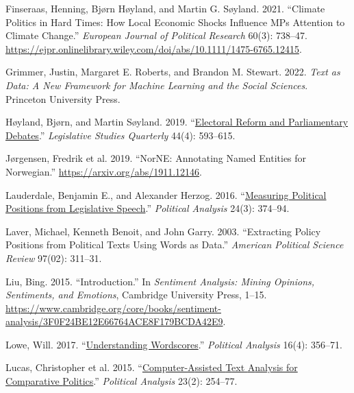 \documentclass[
]{article}
\newlength{\cslhangindent}
\newlength{\cslentryspacingunit} %
\newenvironment{CSLReferences}[2] %
 {%
  \setlength{\parindent}{0pt}
  \ifodd #1
  \let\oldpar\par
  \def\par{\hangindent=\cslhangindent\oldpar}
  \fi
  \setlength{\parskip}{#2\cslentryspacingunit}
 }%
 {}
\begin{document}
\begin{CSLReferences}{1}{0}
\leavevmode{}%
Finseraas, Henning, Bjørn Høyland, and Martin G. Søyland. 2021.
{``Climate Politics in Hard Times: How Local Economic Shocks Influence
MPs Attention to Climate Change.''} \emph{European Journal of Political
Research} 60(3): 738--47.
\url{https://ejpr.onlinelibrary.wiley.com/doi/abs/10.1111/1475-6765.12415}.

\leavevmode{}%
Grimmer, Justin, Margaret E. Roberts, and Brandon M. Stewart. 2022.
\emph{Text as Data: A New Framework for Machine Learning and the Social
Sciences}. Princeton University Press.

\leavevmode{}%
Høyland, Bjørn, and Martin Søyland. 2019.
{``\href{https://doi.org/10.1111/lsq.12237}{Electoral Reform and
Parliamentary Debates}.''} \emph{Legislative Studies Quarterly} 44(4):
593--615.

\leavevmode{}%
Jørgensen, Fredrik et al. 2019. {``NorNE: Annotating Named Entities for
Norwegian.''} \url{https://arxiv.org/abs/1911.12146}.

\leavevmode{}%
Lauderdale, Benjamin E., and Alexander Herzog. 2016.
{``\href{https://doi.org/10.1093/pan/mpw017}{Measuring Political
Positions from Legislative Speech}.''} \emph{Political Analysis} 24(3):
374--94.

\leavevmode{}%
Laver, Michael, Kenneth Benoit, and John Garry. 2003. {``{E}xtracting
{P}olicy {P}ositions from {P}olitical {T}exts {U}sing {W}ords as
{D}ata.''} \emph{American Political Science Review} 97(02): 311--31.

\leavevmode{}%
Liu, Bing. 2015. {``Introduction.''} In \emph{Sentiment Analysis: Mining
Opinions, Sentiments, and Emotions}, Cambridge University Press, 1--15.
\url{https://www.cambridge.org/core/books/sentiment-analysis/3F0F24BE12E66764ACE8F179BCDA42E9}.

\leavevmode{}%
Lowe, Will. 2017.
{``\href{https://doi.org/10.1093/pan/mpn004}{Understanding
Wordscores}.''} \emph{Political Analysis} 16(4): 356--71.

\leavevmode{}%
Lucas, Christopher et al. 2015.
{``\href{https://doi.org/10.1093/pan/mpu019}{Computer-{A}ssisted {T}ext
{A}nalysis for {C}omparative {P}olitics}.''} \emph{Political Analysis}
23(2): 254--77.


\end{CSLReferences}
\end{document}
